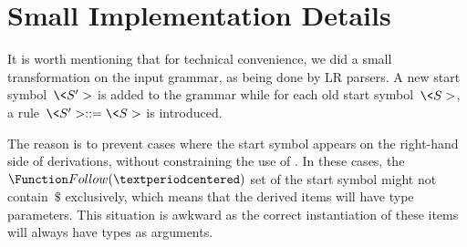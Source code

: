 \section{Small Implementation Details}
It is worth mentioning that for technical convenience, we did a small
transformation on the input grammar, as being done by LR parsers.
A new start symbol~$\<S'>$ is added to the grammar while for each old
start symbol~$\<S>$, a rule~$\<S'> ::= \<S>$ is introduced.

The reason is to prevent cases where the start symbol appears on the
right-hand side of derivations, without constraining the use of \Fajita.
In these cases, the~$\Function Follow(·)$ set of the start symbol
might not contain~$\$$ exclusively, which means that the derived items
will have type parameters. This situation is awkward as the correct instantiation
of these items will always have  types as arguments.
